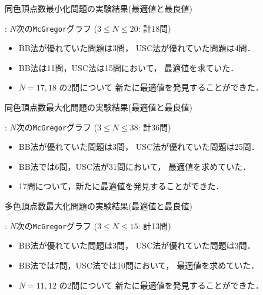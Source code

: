 \documentclass[dvipdfmx,11pt]{beamer}
\newcommand{\code}[1]{\lstinline[basicstyle=\ttfamily]{#1}}
\begin{document}
\begin{frame}{同色頂点数最小化問題の実験結果(最適値と最良値)}
 \begin{block}{}
  : $N$次の\code{McGregor}グラフ ($3 \leq N\leq 20$: 計18問)
 \end{block}

 \begin{center}
  
 \end{center}

 \begin{itemize}
  \item BB法が優れていた問題は3問，
        USC法が優れていた問題は4問．
  \item BB法は11問，USC法は15問において，
	最適値を求ていた．
  \item $N = 17,18$ の2問について
	新たに最適値を発見することができた．
 \end{itemize}
\end{frame}

\begin{frame}{同色頂点数最大化問題の実験結果(最適値と最良値)}
 \begin{block}{}
  : $N$次の\code{McGregor}グラフ ($3 \leq N\leq 38$: 計36問)
 \end{block}
 
 \begin{center}
  
 \end{center}

 \begin{itemize}
  \item BB法が優れていた問題は3問，
        USC法が優れていた問題は25問．
  \item BB法では6問，USC法が31問において，
	最適値を求めていた．
  \item 17問について，新たに最適値を発見することができた．
 \end{itemize}
\end{frame}

\begin{frame}{多色頂点数最大化問題の実験結果(最適値と最良値)}
 \begin{block}{}
  : $N$次の\code{McGregor}グラフ ($3 \leq N\leq 15$: 計13問)
 \end{block}
 
 \begin{center}
  
 \end{center}

 \begin{itemize}
  \item BB法が優れていた問題は3問，
        USC法が優れていた問題は3問．
  \item BB法では7問，USC法では10問において，
	最適値を求めていた．
  \item $N = 11,12$ の2問について
	新たに最適値を発見することができた．
 \end{itemize}
\end{frame}
\end{document}

